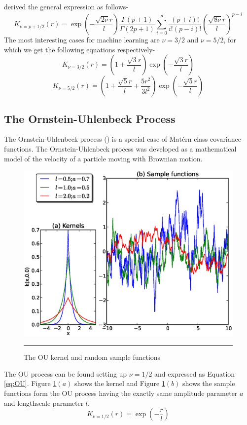 derived the general expression as follows-
\begin{equation} \label{eq:MaternGeneral}
K_{\nu=p+1/2}(r)= \exp \left( - \frac{\sqrt{2\nu}r}{l}\right)\frac{\Gamma\left(p+1\right)}{\Gamma\left(2p+1\right)}
		\sum_{i=0}^{p}\frac{\left(p+i\right)!}{i!\left(p-i\right)!}
		\left(\frac{\sqrt{8\nu}r}{l}\right)^{p-i}
\end{equation}
The most interesting cases for machine learning
are $\nu =3/2$ and $\nu=5/2$, for which we get the following equations respectively-
\begin{equation} \label{eq:Matern32}
K_{\nu=3/2}(r)= \left(1+ \frac{\sqrt{3}r}{l} \right)\exp \left( - \frac{\sqrt{3}r}{l} \right)
\end{equation}
\begin{equation} \label{eq:Matern52}
K_{\nu=5/2}(r)= \left(1+ \frac{\sqrt{5}r}{l} + \frac{5r^2}{3l^2} \right)
		\exp \left( - \frac{\sqrt{5}r}{l} \right)
\end{equation}

\subsection{The Ornstein-Uhlenbeck Process}
The Ornstein-Uhlenbeck process (\cite{Ornstein_Uhlenbeck:1930}) is a special case of 
Mat{\'e}rn class covariance functions. The Ornstein-Uhlenbeck process was 
developed as a mathematical model of the velocity of a particle moving with Brownian motion.
\begin{figure}[t]
	\centering
		\includegraphics[width=14cm,keepaspectratio]{diagrams/OU_cov.eps}
		\rule{35em}{0.5pt}
	\caption[The OU kernel and random sample functions]
		{The OU kernel and random sample functions}
	\label{fig:OU_covariance}
\end{figure}
The OU process can be found setting up $\nu=1/2$ and expressed as Equation \ref{eq:OU}.
Figure \ref{fig:OU_covariance}$(a)$ shows the kernel and
Figure \ref{fig:OU_covariance}$(b)$ shows the sample functions form the OU process having the 
exactly same amplitude parameter $a$ and lengthscale parameter $l$.  
\begin{equation} \label{eq:OU}
K_{\nu=1/2}(r)=	\exp \left(-\frac{r}{l} \right)
\end{equation}

